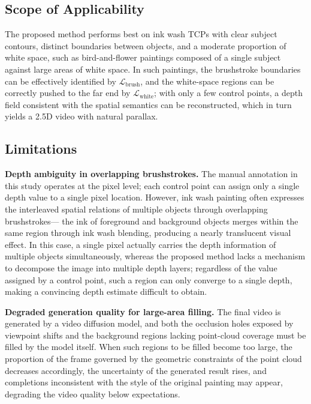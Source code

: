 \subsection{Scope of Applicability}

The proposed method performs best on ink wash TCPs with clear subject contours, distinct boundaries between objects, and a moderate proportion of white space,
such as bird-and-flower paintings composed of a single subject against large areas of white space.
In such paintings, the brushstroke boundaries can be effectively identified by $\mathcal{L}_{\mathrm{brush}}$,
and the white-space regions can be correctly pushed to the far end by $\mathcal{L}_{\mathrm{white}}$;
with only a few control points, a depth field consistent with the spatial semantics can be reconstructed,
which in turn yields a 2.5D video with natural parallax.

\subsection{Limitations}

\textbf{Depth ambiguity in overlapping brushstrokes.}
The manual annotation in this study operates at the pixel level; each control point can assign only a single depth value to a single pixel location.
However, ink wash painting often expresses the interleaved spatial relations of multiple objects through overlapping brushstrokes---
the ink of foreground and background objects merges within the same region through ink wash blending, producing a nearly translucent visual effect.
In this case, a single pixel actually carries the depth information of multiple objects simultaneously,
whereas the proposed method lacks a mechanism to decompose the image into multiple depth layers;
regardless of the value assigned by a control point, such a region can only converge to a single depth,
making a convincing depth estimate difficult to obtain.

\textbf{Degraded generation quality for large-area filling.}
The final video is generated by a video diffusion model,
and both the occlusion holes exposed by viewpoint shifts and the background regions lacking point-cloud coverage must be filled by the model itself.
When such regions to be filled become too large,
the proportion of the frame governed by the geometric constraints of the point cloud decreases accordingly,
the uncertainty of the generated result rises,
and completions inconsistent with the style of the original painting may appear, degrading the video quality below expectations.

